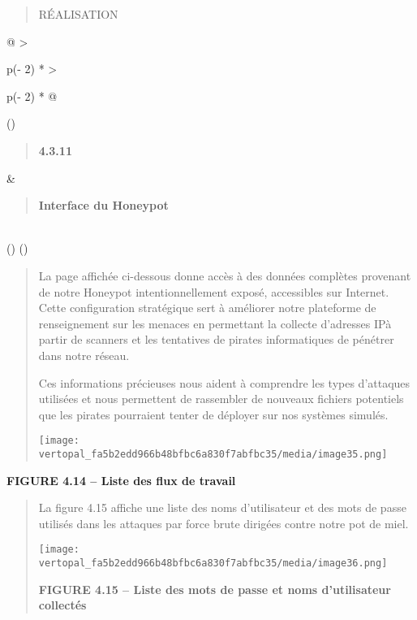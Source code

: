 \documentclass[
]{article}
\begin{document}
\begin{quote}
RÉALISATION
\end{quote}

\begin{longtable}[]{@{}
  >{\raggedright\arraybackslash}p{(\columnwidth - 2\tabcolsep) * }
  >{\raggedright\arraybackslash}p{(\columnwidth - 2\tabcolsep) * }@{}}
\toprule()
\begin{minipage}[b]{\linewidth}\raggedright
\begin{quote}
\textbf{4.3.11}
\end{quote}
\end{minipage} & \begin{minipage}[b]{\linewidth}\raggedright
\begin{quote}
\textbf{Interface du Honeypot}
\end{quote}
\end{minipage} \\
\midrule()
\endhead
\bottomrule()
\end{longtable}

\begin{quote}
La page affichée ci-dessous donne accès à des données complètes
provenant de notre Honeypot intentionnellement exposé, accessibles sur
Internet. Cette configuration stratégique sert à améliorer notre
plateforme de renseignement sur les menaces en permettant la collecte
d'adresses IPà partir de scanners et les tentatives de pirates
informatiques de pénétrer dans notre réseau.

Ces informations précieuses nous aident à comprendre les types
d'attaques utilisées et nous permettent de rassembler de nouveaux
fichiers potentiels que les pirates pourraient tenter de déployer sur
nos systèmes simulés.

\texttt{[image: vertopal\_fa5b2edd966b48bfbc6a830f7abfbc35/media/image35.png]}
\end{quote}

\textbf{FIGURE 4.14 -- Liste des flux de travail}

\begin{quote}
La figure 4.15 affiche une liste des noms d'utilisateur et des mots de
passe utilisés dans les attaques par force brute dirigées contre notre
pot de miel.

\texttt{[image: vertopal\_fa5b2edd966b48bfbc6a830f7abfbc35/media/image36.png]}

\textbf{FIGURE 4.15 -- Liste des mots de passe et noms d'utilisateur
collectés}
\end{quote}
\end{document}
